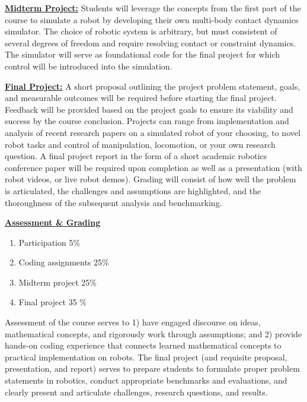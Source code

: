 \documentclass[11pt,letterpaper]{article}
\newcommand{\mysec}[1]{\medskip\noindent\underline{\textbf{#1}}}
\begin{document}
\mysec{Midterm Project:} Students will leverage the concepts from the first part of the course to simulate a robot by developing their own multi-body contact dynamics simulator. The choice of robotic system is arbitrary, but must consistent of several degrees of freedom and require resolving contact or constraint dynamics. The simulator will serve as foundational code for the final project for which control will be introduced into the simulation. 

\mysec{Final Project:} A short proposal outlining the project problem statement, goals, and measurable outcomes will be required before starting the final project. Feedback will be provided based on the project goals to ensure its viability and success by the course conclusion.  Projects can range from implementation and analysis of recent research papers on a simulated robot of your choosing, to novel robot tasks and control of manipulation, locomotion, or your own research question. A final project report in the form of a short academic robotics conference paper will be required upon completion as well as a presentation (with robot videos, or live robot demos). Grading will consist of how well the problem is articulated, the challenges and assumptions are highlighted, and the thoroughness of the subsequent analysis and benchmarking.


\mysec{Assessment \& Grading}

\begin{enumerate}[noitemsep]
	\item Participation 5\%
	\item Coding assignments 25\%
	\item Midterm project 25\%
	\item Final project 35 \%
\end{enumerate}


Assessment of the course serves to 1) have engaged discourse on ideas, mathematical concepts, and rigorously work through assumptions; and 2) provide hands-on coding experience that connects learned mathematical concepts to practical implementation on robots. The final project (and requisite proposal, presentation, and report) serves to prepare students to formulate proper problem statements in robotics, conduct appropriate benchmarks and evaluations, and clearly present and articulate challenges, research questions, and results. 
\end{document}
